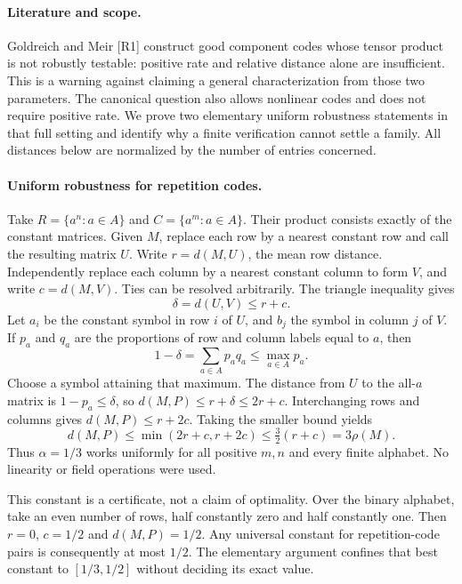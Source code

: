 \documentclass[11pt,a4paper]{article}
\begin{document}
\paragraph{Literature and scope.}
Goldreich and Meir [R1] construct good component codes whose tensor
product is not robustly testable: positive rate and relative distance
alone are insufficient. This is a warning against claiming a general
characterization from those two parameters. The canonical question
also allows nonlinear codes and does not require positive rate.
We prove two elementary uniform robustness statements in that full
setting and identify why a finite verification cannot settle a family.
All distances below are normalized by the number of entries concerned.

\paragraph{Uniform robustness for repetition codes.}
Take $R=\{a^n:a\in A\}$ and $C=\{a^m:a\in A\}$. Their product consists
exactly of the constant matrices. Given $M$, replace each row by a
nearest constant row and call the resulting matrix $U$. Write
$r=d(M,U)$, the mean row distance. Independently replace each column
by a nearest constant column to form $V$, and write $c=d(M,V)$.
Ties can be resolved arbitrarily. The triangle inequality gives
\[
                   \delta=d(U,V)\le r+c.
\]
Let $a_i$ be the constant symbol in row $i$ of $U$, and $b_j$ the
symbol in column $j$ of $V$. If $p_a$ and $q_a$ are the proportions
of row and column labels equal to $a$, then
\[
                   1-\delta=\sum_{a\in A}p_aq_a
                              \le\max_{a\in A}p_a.
\]
Choose a symbol attaining that maximum. The distance from $U$ to the
all-$a$ matrix is $1-p_a\le\delta$, so
$d(M,P)\le r+\delta\le2r+c$. Interchanging rows and columns gives
$d(M,P)\le r+2c$. Taking the smaller bound yields
\[
 d(M,P)\le\min(2r+c,r+2c)
          \le\tfrac32(r+c)=3\rho(M).
\]
Thus $\alpha=1/3$ works uniformly for all positive $m,n$ and every
finite alphabet. No linearity or field operations were used.

This constant is a certificate, not a claim of optimality. Over the
binary alphabet, take an even number of rows, half constantly zero
and half constantly one. Then $r=0$, $c=1/2$ and $d(M,P)=1/2$.
Any universal constant for repetition-code pairs is consequently at
most $1/2$. The elementary argument confines that best constant to
$[1/3,1/2]$ without deciding its exact value.
\end{document}
